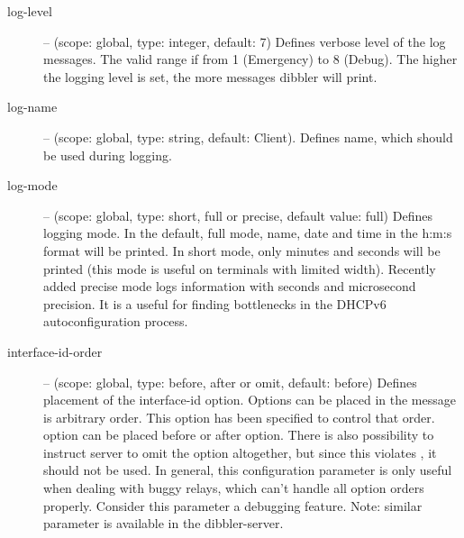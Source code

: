 \begin{description}
 \item[log-level] -- (scope: global, type: integer, default: 7) Defines
	    verbose level of the log messages. The valid range if
	    from 1 (Emergency) to 8 (Debug). The higher the logging
	    level is set, the more messages dibbler will print.
 \item[log-name] -- (scope: global, type: string, default: Client). Defines 
	    name, which should be used during logging.
 \item[log-mode] -- (scope: global, type: short, full or precise,
	    default value: full) Defines logging mode. In the
	    default, full mode, name, date and time in the h:m:s format
	    will be printed. In short mode, only minutes and
	    seconds will be printed (this mode is useful on
	    terminals with limited width). Recently added precise
	    mode logs information with seconds and microsecond
	    precision. It is a useful for finding bottlenecks in
	    the DHCPv6 autoconfiguration process.
\item[interface-id-order] -- (scope: global, type: before, after or omit, 
        default: before) Defines placement of the
        interface-id option. Options can be placed in the 
        message is arbitrary order. This option has been specified to control
        that order.  option can be placed before or after
         option. There is also possibility to instruct
        server to omit the  option altogether, but since 
        this violates \cite{rfc3315}, it should not be used. In general, this
        configuration parameter is only useful when dealing with buggy relays,
        which can't handle all option orders properly. Consider this parameter
        a debugging feature. Note: similar parameter is available in the dibbler-server. 


\end{description}
